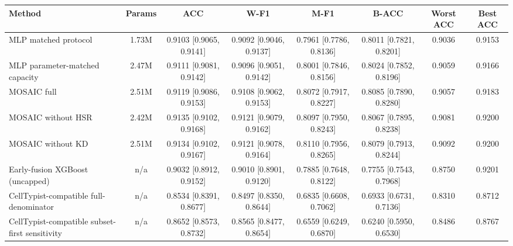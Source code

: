 \begin{tabular}{lccccccc}
\toprule
Method & Params & ACC & W-F1 & M-F1 & B-ACC & Worst ACC & Best ACC \\
\midrule
MLP matched protocol & 1.73M & 0.9103 [0.9065, 0.9141] & 0.9092 [0.9046, 0.9137] & 0.7961 [0.7786, 0.8136] & 0.8011 [0.7821, 0.8201] & 0.9036 & 0.9153 \\
MLP parameter-matched capacity & 2.47M & 0.9111 [0.9081, 0.9142] & 0.9096 [0.9051, 0.9142] & 0.8001 [0.7846, 0.8156] & 0.8024 [0.7852, 0.8196] & 0.9059 & 0.9166 \\
MOSAIC full & 2.51M & 0.9119 [0.9086, 0.9153] & 0.9108 [0.9062, 0.9153] & 0.8072 [0.7917, 0.8227] & 0.8085 [0.7890, 0.8280] & 0.9057 & 0.9183 \\
MOSAIC without HSR & 2.42M & 0.9135 [0.9102, 0.9168] & 0.9121 [0.9079, 0.9162] & 0.8097 [0.7950, 0.8243] & 0.8067 [0.7895, 0.8238] & 0.9081 & 0.9200 \\
MOSAIC without KD & 2.51M & 0.9134 [0.9102, 0.9167] & 0.9121 [0.9078, 0.9164] & 0.8110 [0.7956, 0.8265] & 0.8079 [0.7913, 0.8244] & 0.9092 & 0.9200 \\
Early-fusion XGBoost (uncapped) & n/a & 0.9032 [0.8912, 0.9152] & 0.9010 [0.8901, 0.9120] & 0.7885 [0.7648, 0.8122] & 0.7755 [0.7543, 0.7968] & 0.8750 & 0.9201 \\
CellTypist-compatible full-denominator & n/a & 0.8534 [0.8391, 0.8677] & 0.8497 [0.8350, 0.8644] & 0.6835 [0.6608, 0.7062] & 0.6933 [0.6731, 0.7136] & 0.8310 & 0.8712 \\
CellTypist-compatible subset-first sensitivity & n/a & 0.8652 [0.8573, 0.8732] & 0.8565 [0.8477, 0.8654] & 0.6559 [0.6249, 0.6870] & 0.6240 [0.5950, 0.6530] & 0.8486 & 0.8767 \\
\bottomrule
\end{tabular}
